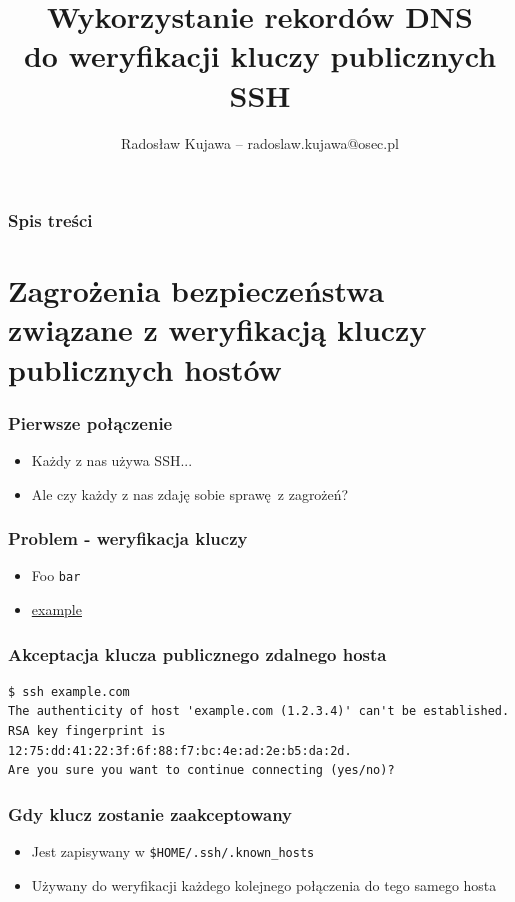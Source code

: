 \documentclass[dvipsnames,table]{beamer}
\title{Wykorzystanie rekordów DNS \\ do weryfikacji kluczy publicznych SSH}
\author{Radosław Kujawa -- radoslaw.kujawa@osec.pl}
\institute{OSEC}
\begin{document}
\begin{frame}
\titlepage
\end{frame}

\begin{frame}[allowframebreaks]
\frametitle{Spis treści}
{
\hypersetup{colorlinks=true,linkcolor=black,urlcolor=OSEC-red}
\tableofcontents
}
\end{frame}


\section{Zagrożenia bezpieczeństwa związane z weryfikacją kluczy publicznych hostów}

\begin{frame}
\frametitle{Pierwsze połączenie}
\begin{itemize}
	\item Każdy z nas używa SSH...
	\item Ale czy każdy z nas zdaję sobie sprawę z zagrożeń? 
\end{itemize}
\end{frame}

\begin{frame}
\frametitle{Problem - weryfikacja kluczy}
\begin{itemize}
	\item Foo {\tt bar}
	\item \href{http://example.com/}{example}
\end{itemize}
\end{frame}

\begin{frame}[fragile]
\frametitle{Akceptacja klucza publicznego zdalnego hosta}
\scriptsize
\begin{verbatim}
$ ssh example.com
The authenticity of host 'example.com (1.2.3.4)' can't be established.
RSA key fingerprint is 12:75:dd:41:22:3f:6f:88:f7:bc:4e:ad:2e:b5:da:2d.
Are you sure you want to continue connecting (yes/no)?
\end{verbatim}
\end{frame}

\begin{frame}
\frametitle{Gdy klucz zostanie zaakceptowany}
\begin{itemize}
	\item Jest zapisywany w {\tt \$HOME/.ssh/.known\_hosts}
	\item Używany do weryfikacji każdego kolejnego połączenia do tego samego hosta
\end{itemize}
\end{frame}
\end{document}
